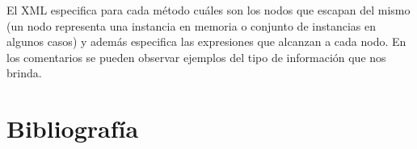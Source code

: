 \documentclass[12pt,a4paper]{article}
\begin{document}
			El XML especifica para cada método cuáles son los nodos que escapan del mismo (un nodo representa una instancia en memoria o conjunto de instancias en algunos casos) y además especifica las expresiones que alcanzan a cada nodo. En los comentarios se pueden observar ejemplos del tipo de información que nos brinda.

	\newpage
	\section{Bibliografía}
	
\end{document}

